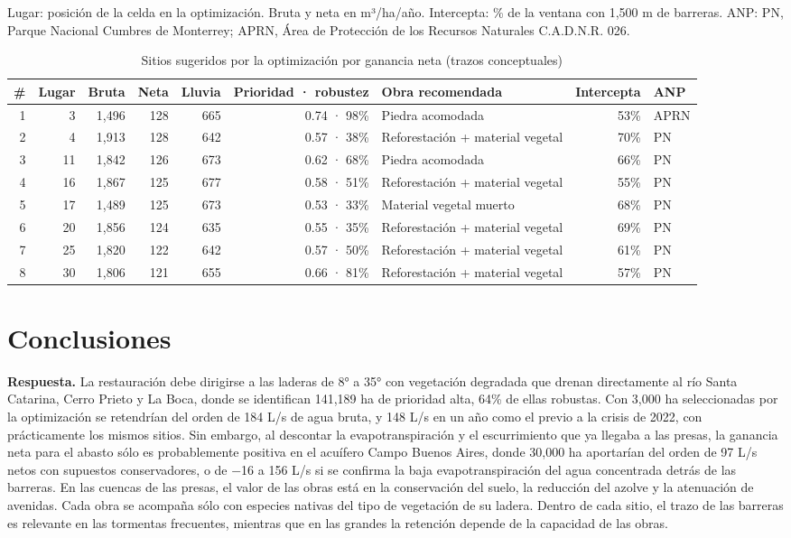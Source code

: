 \documentclass[11pt,letterpaper]{article}
\newcommand{\respuesta}[1]{\begin{cajarespuesta}\textbf{\color{naranja}Respuesta.} #1\end{cajarespuesta}}
\begin{document}
\begin{table}[H]\centering\footnotesize
\caption{Sitios sugeridos por la optimización por ganancia neta (trazos conceptuales)}\label{tab:sitios}
{\color{gris}Lugar: posición de la celda en la optimización. Bruta y neta en m³/ha/año. Intercepta: \% de la ventana con 1,500 m de barreras. ANP: PN, Parque Nacional Cumbres de Monterrey; APRN, Área de Protección de los Recursos Naturales C.A.D.N.R. 026.\par}\smallskip
\begin{tabularx}{\linewidth}{rrrrrr>{\raggedright\arraybackslash}Xrl}
\toprule
\# & Lugar & Bruta & Neta & Lluvia & Prioridad · robustez & Obra recomendada & Intercepta & ANP \\
\midrule
1 & 3 & 1,496 & 128 & 665 & 0.74 · 98\% & Piedra acomodada & 53\% & APRN \\
2 & 4 & 1,913 & 128 & 642 & 0.57 · 38\% & Reforestación + material vegetal & 70\% & PN \\
3 & 11 & 1,842 & 126 & 673 & 0.62 · 68\% & Piedra acomodada & 66\% & PN \\
4 & 16 & 1,867 & 125 & 677 & 0.58 · 51\% & Reforestación + material vegetal & 55\% & PN \\
5 & 17 & 1,489 & 125 & 673 & 0.53 · 33\% & Material vegetal muerto & 68\% & PN \\
6 & 20 & 1,856 & 124 & 635 & 0.55 · 35\% & Reforestación + material vegetal & 69\% & PN \\
7 & 25 & 1,820 & 122 & 642 & 0.57 · 50\% & Reforestación + material vegetal & 61\% & PN \\
8 & 30 & 1,806 & 121 & 655 & 0.66 · 81\% & Reforestación + material vegetal & 57\% & PN \\
\bottomrule
\end{tabularx}
\end{table}

\section{Conclusiones}

\respuesta{La restauración debe dirigirse a las laderas de 8° a 35° con vegetación degradada que drenan directamente al río Santa Catarina, Cerro Prieto y La Boca, donde se identifican 141,189 ha de prioridad alta, 64\% de ellas robustas. Con 3,000 ha seleccionadas por la optimización se retendrían del orden de 184 L/s de agua bruta, y 148 L/s en un año como el previo a la crisis de 2022, con prácticamente los mismos sitios. Sin embargo, al descontar la evapotranspiración y el escurrimiento que ya llegaba a las presas, la ganancia neta para el abasto sólo es probablemente positiva en el acuífero Campo Buenos Aires, donde 30,000 ha aportarían del orden de 97 L/s netos con supuestos conservadores, o de −16 a 156 L/s si se confirma la baja evapotranspiración del agua concentrada detrás de las barreras. En las cuencas de las presas, el valor de las obras está en la conservación del suelo, la reducción del azolve y la atenuación de avenidas. Cada obra se acompaña sólo con especies nativas del tipo de vegetación de su ladera. Dentro de cada sitio, el trazo de las barreras es relevante en las tormentas frecuentes, mientras que en las grandes la retención depende de la capacidad de las obras.}
\end{document}
